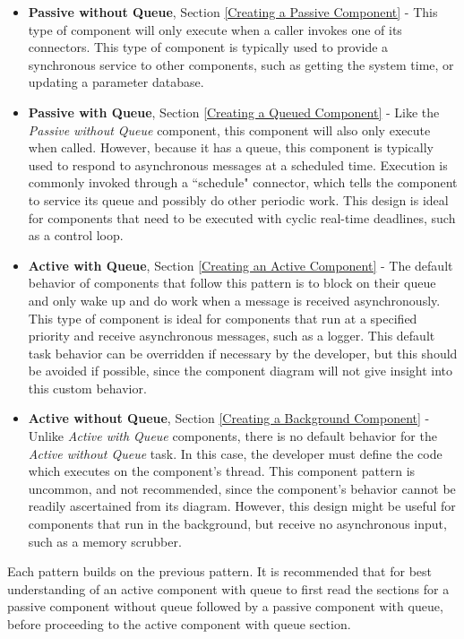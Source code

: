 \vspace{5mm} %
\begin{itemize}
  \item \textbf{Passive without Queue}, Section \ref{Creating a Passive Component} - This type of component will only execute when a caller invokes one of its connectors. This type of component is typically used to provide a synchronous service to other components, such as getting the system time, or updating a parameter database.
  \item \textbf{Passive with Queue}, Section \ref{Creating a Queued Component} - Like the \textit{Passive without Queue} component, this component will also only execute when called. However, because it has a queue, this component is typically used to respond to asynchronous messages at a scheduled time. Execution is commonly invoked through a ``schedule" connector, which tells the component to service its queue and possibly do other periodic work. This design is ideal for components that need to be executed with cyclic real-time deadlines, such as a control loop.
  \item \textbf{Active with Queue}, Section \ref{Creating an Active Component} - The default behavior of components that follow this pattern is to block on their queue and only wake up and do work when a message is received asynchronously. This type of component is ideal for components that run at a specified priority and receive asynchronous messages, such as a logger. This default task behavior can be overridden if necessary by the developer, but this should be avoided if possible, since the component diagram will not give insight into this custom behavior.
  \item \textbf{Active without Queue}, Section \ref{Creating a Background Component} - Unlike \textit{Active with Queue} components, there is no default behavior for the \textit{Active without Queue} task. In this case, the developer must define the code which executes on the component's thread. This component pattern is uncommon, and not recommended, since the component's behavior cannot be readily ascertained from its diagram. However, this design might be useful for components that run in the background, but receive no asynchronous input, such as a memory scrubber.
\end{itemize}
\vspace{5mm} %

Each pattern builds on the previous pattern. It is recommended that for best understanding of an active component with queue to first read the sections for a passive component without queue followed by a passive component with queue, before proceeding to the active component with queue section.

